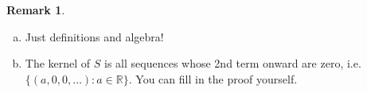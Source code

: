 \documentclass[11pt,oneside]{amsart}
\theoremstyle{definition}
\newtheorem{remark}{Remark}
\newcommand{\bR}{\mathbb{R}}
\begin{document}
    \begin{remark}
        \leavevmode\begin{enumerate}[(a)]
            \item Just definitions and algebra!
            \item The kernel of $S$ is all sequences whose 2nd term onward are zero, i.e. $\{(a,0,0,\dots):a\in\bR\}$. You can fill in the proof yourself.
        \end{enumerate}
    \end{remark}
\end{document}
